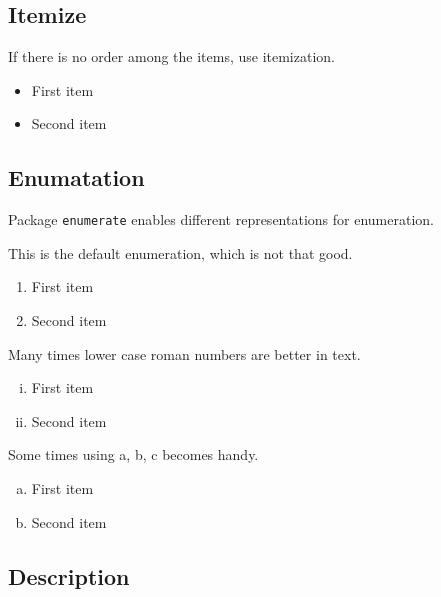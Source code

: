 \documentclass[10pt,journal,compsoc]{IEEEtran}
\newcommand{\hCode}[1]{\texttt{#1}}
\theoremstyle{plain}
\theoremstyle{definition}
\theoremstyle{remark}
\begin{document}
\subsection{Itemize}

If there is no order among the items,
use itemization.
\begin{itemize}
	
	\item 
	First item
	
	\item 
	Second item
	
\end{itemize}





\subsection{Enumatation}

Package \hCode{enumerate} enables different representations for enumeration.

This is the default enumeration,
which is not that good.
\begin{enumerate}
	
	\item 
	First item
	
	\item 
	Second item
	
\end{enumerate}

Many times lower case roman numbers are better in text.
\begin{enumerate}[i.]
	
	\item 
	First item
	
	\item 
	Second item
	
\end{enumerate}

Some times using a, b, c becomes handy.
\begin{enumerate}[a.]
	
	\item 
	First item
	
	\item 
	Second item
	
\end{enumerate}




\subsection{Description}
\end{document}
